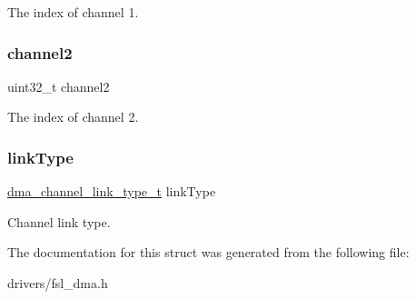 The index of channel 1. \mbox{\label{struct__dma__channel__link__config_a06ad26bec06cf3a7a6300bc7185bca0d}} 
\subsubsection{\texorpdfstring{channel2}{channel2}}
{\footnotesize\ttfamily uint32\+\_\+t channel2}

The index of channel 2. \mbox{\label{struct__dma__channel__link__config_a25aac2215fe115938f3cdf9e575beed1}} 
\subsubsection{\texorpdfstring{linkType}{linkType}}
{\footnotesize\ttfamily \mbox{\hyperlink{group__dma_ga3ee1ff3a58659ae3e61603b672b0a2fb}{dma\+\_\+channel\+\_\+link\+\_\+type\+\_\+t}} link\+Type}

Channel link type. 

The documentation for this struct was generated from the following file\+:\begin{DoxyCompactItemize}
\item 
drivers/fsl\+\_\+dma.\+h\end{DoxyCompactItemize}
